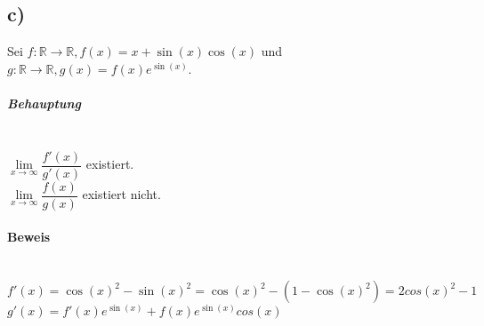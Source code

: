 \subsection*{c)}
Sei $ f:\mathbb{R} \to \mathbb{R},f(x) = x + \sin(x)\cos(x) $ und $ g:\mathbb{R} \to \mathbb{R},g(x) = f(x)e^{\sin(x)} $.

\subparagraph*{Behauptung} ~\\
\indent $\lim\limits_{x \to \infty} \dfrac{f'(x)}{g'(x)}$ existiert.\\
\indent $\lim\limits_{x \to \infty} \dfrac{f(x)}{g(x)}$ existiert nicht.

\paragraph*{Beweis} ~\\
\indent $ f'(x) = \cos(x)^{2}-\sin(x)^{2} = \cos(x)^{2}-(1-\cos(x)^{2}) = 2 cos(x)^{2} - 1 $ \\
\indent $ g'(x) = f'(x)e^{\sin(x)}+f(x)e^{\sin(x)}cos(x)$ \\

